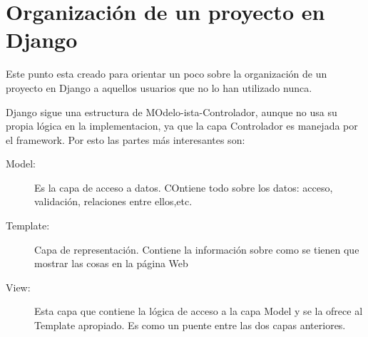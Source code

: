 \section{Organización de un proyecto en Django}

Este punto esta creado para orientar un poco sobre la organización de un proyecto
en Django a aquellos usuarios que no lo han utilizado nunca.

Django sigue una estructura de MOdelo-ista-Controlador, aunque no usa su propia lógica en
la implementacion, ya que la capa Controlador es manejada por el framework. Por esto las partes más interesantes son:

\begin{description}
	\item[Model:] Es la capa de acceso a datos. COntiene todo sobre los datos: acceso, 
	validación, relaciones entre ellos,etc.
	\item[Template:] Capa de representación. Contiene la información sobre como se tienen que 
	mostrar las cosas en la página Web
	\item[View:] Esta capa que contiene la lógica de acceso a la capa Model y se la ofrece
	al Template apropiado. Es como un puente entre las dos capas anteriores.
\end{description}


